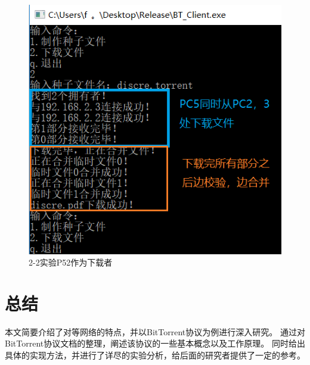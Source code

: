 \documentclass[thesis]{thesis}
\begin{document}
	\begin{figure}[H]
		\centering
		\includegraphics[width=0.4\linewidth]{fig/PC5_22.png}
		\caption{2-2实验\quad P52作为下载者}
		\label{res:PC5_22}
	\end{figure}
	
	\section{总结}
	本文简要介绍了对等网络的特点，并以BitTorrent协议为例进行深入研究。
	通过对BitTorrent协议文档的整理，阐述该协议的一些基本概念以及工作原理。
	同时给出具体的实现方法，并进行了详尽的实验分析，给后面的研究者提供了一定的参考。
	
	
	
	
\end{document}
